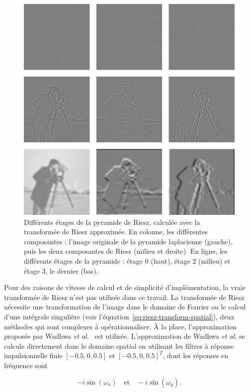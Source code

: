 \begin{figure}
    \centering
    \includegraphics[width=.65\textwidth]{contenu/resources/images/riesz_pyramid_cameraman}
    \caption[Pyramide de Riesz]{Différents étages de la pyramide de Riesz, calculée avec la transformée de Riesz approximée. En colonne, les différentes composantes : l'image originale de la pyramide laplacienne (gauche), puis les deux composantes de Riesz (milieu et droite). En ligne, les différents étages de la pyramide : étage 0 (haut), étage 2 (milieu) et étage 3, le dernier (bas).}
    \label{fig:riesz-pyramid-cameraman}
\end{figure}

Pour des raisons de vitesse de calcul et de simplicité d'implémentation, la vraie transformée de Riesz n'est pas utilisée dans ce travail. La transformée de Riesz nécessite une transformation de l'image dans le domaine de Fourier ou le calcul d'une intégrale singulière (voir l'équation~\ref{eq:riesz-transform-spatial}), deux méthodes qui sont complexes à opérationnaliser. À la place, l'approximation proposée par Wadhwa \textit{et al.}~\cite{wadhwa_riesz_2014} est utilisée. L'approximation de Wadhwa \textit{et al.} se calcule directement dans le domaine spatial en utilisant les filtres à réponse impulsionnelle finie $[-0.5, 0, 0.5]$ et $[-0.5, 0, 0.5]^T$, dont les réponses en fréquence sont

\begin{equation}
    -i\sin(\omega_x) \quad \text{et} \quad -i\sin(\omega_y).
\end{equation}

